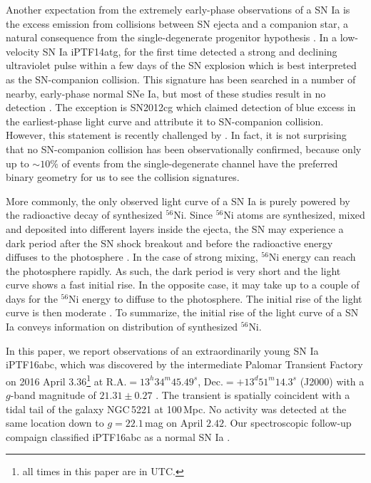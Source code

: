 \documentclass[twocolumn]{aastex61}
\begin{document}
Another expectation from the extremely early-phase observations of a
SN Ia is the excess emission from collisions between SN ejecta and a
companion star, a natural consequence from the single-degenerate
progenitor hypothesis \citep{1973ApJ...186.1007W,2010ApJ...708.1025K}.
In a low-velocity SN Ia iPTF14atg, \citet{2015Natur.521..328C} for the
first time detected a strong and declining ultraviolet pulse within a
few days of the SN explosion which is best interpreted as the
SN-companion collision. This signature has been searched in a number
of nearby, early-phase normal SNe Ia, but most of these studies result
in no detection
\citep{2010ApJ...722.1691H,2011ApJ...741...20B,2012ApJ...744...38F,
  2012ApJ...744L..17B,2015Natur.521..332O,
  2013ApJ...778L..15Z,2015ApJ...799..106G,2016ApJ...826..144S,
  2015ApJS..221...22I}. The exception is SN2012cg which
\citet{2016ApJ...820...92M} claimed detection of blue excess in the
earliest-phase light curve and attribute it to SN-companion collision.
However, this statement is recently challenged by
\citet{2016arXiv161007601S}. In fact, it is not surprising that no
SN-companion collision has been observationally confirmed, because
only up to $\sim 10\%$ of events from the single-degenerate channel
have the preferred binary geometry for us to see the collision
signatures.

More commonly, the only observed light curve of a SN Ia is purely
powered by the radioactive decay of synthesized $^{56}$Ni. Since
$^{56}$Ni atoms are synthesized, mixed and deposited into different
layers inside the ejecta, the SN may experience a dark period after
the SN shock breakout and before the radioactive energy diffuses to
the photosphere \citep{2014ApJ...784...85P}. In the case of strong
mixing, $^{56}$Ni energy can reach the photosphere rapidly. As such,
the dark period is very short and the light curve shows a fast initial
rise. In the opposite case, it may take up to a couple of days for
the $^{56}$Ni energy to diffuse to the photosphere. The initial rise
of the light curve is then moderate \citep{2016ApJ...826...96P}. To
summarize, the initial rise of the light curve of a SN Ia conveys
information on distribution of synthesized $^{56}$Ni. 

In this paper, we report observations of an extraordinarily young SN
Ia iPTF16abc, which was discovered by the intermediate Palomar
Transient Factory on 2016 April $3.36$\footnote{all times in this
  paper are in UTC.} at $\textrm{R.A.}=13^h34^m45.49^s$,
$\textrm{Dec.}=+13^d51^m14.3^s$ (J2000) with a $g$-band magnitude of
$21.31\pm0.27$ \citep{2016PASP..128k4502C,2016ATel.8907....1M}. The
transient is spatially coincident with a tidal tail of the galaxy
NGC\,5221 at 100\,Mpc. No activity was detected at the same location
down to $g=22.1$\,mag on April $2.42$. Our spectroscopic follow-up
compaign classified iPTF16abc as a normal SN Ia
\citep{2016ATel.8909....1C}.
\end{document}
